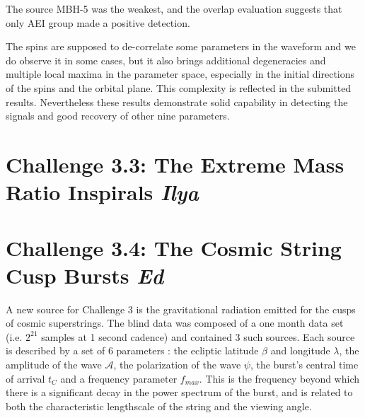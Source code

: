 \documentclass{iopart}
\begin{document}
The source MBH-5 was the weakest, and the overlap evaluation suggests that only AEI group made a positive detection. 

The spins are supposed to de-correlate some parameters in the waveform \cite{SpinBBHLangHugues} and we 
do observe it in some cases, but 
it also brings additional degeneracies and multiple local maxima in the parameter space, especially in the 
initial directions of the spins and the orbital plane. This complexity is reflected in the submitted results.
Nevertheless these results demonstrate solid capability in detecting the signals and good recovery of other 
nine parameters. 




\section{Challenge 3.3: The Extreme Mass Ratio Inspirals {\it Ilya}}

\section{Challenge 3.4: The Cosmic String Cusp Bursts {\it Ed}}

A new source for Challenge 3 is the gravitational radiation emitted for the cusps of cosmic superstrings.  The blind data was composed of a one month data set (i.e. $2^{21}$ samples at 1 second cadence) and contained 3 such sources.  Each source is described
by a set of 6 parameters : the ecliptic latitude $\beta$ and longitude $\lambda$, the amplitude of the wave ${\mathcal A}$, the polarization of the wave $\psi$, the burst's
central time of arrival $t_C$ and a frequency parameter $f_{max}$.  This is the frequency beyond which there is a significant decay in the power spectrum of the burst, and is related to both the characteristic lengthscale of the string and the viewing angle.
\end{document}

